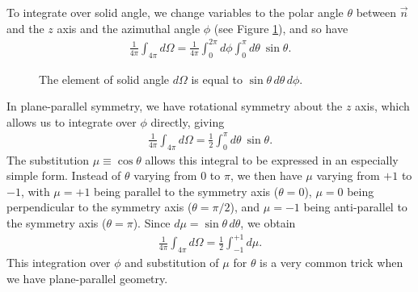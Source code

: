 \newslide

To integrate over solid angle, we change variables to the polar angle
$\theta$ between $\vec n$ and the $z$ axis and the azimuthal angle
$\phi$ (see Figure
\ref{fig-dOmega}), and so have
\begin{align}
\frac{1}{4\pi}
\int_{4\pi}\!\!\!d\Omega =
\frac{1}{4\pi}
\int_0^{2\pi}\!\!\!d\phi\int_0^\pi\!\!\!d\theta\:
\sin\theta.
\end{align}
\begin{figure}
\begin{center}
\end{center}
\caption{The element of solid angle $d\Omega$ is equal to $\sin\theta\,d\theta
\,d\phi$.}
\label{fig-dOmega}
\end{figure}

\newslide

In plane-parallel symmetry, we have rotational symmetry
about the $z$ axis, which allows us to integrate over $\phi$ directly,
giving
\begin{align}
\frac{1}{4\pi}
\int_{4\pi}\!\!\!d\Omega =
\frac{1}{2}\int_0^\pi\!\!\!d\theta\:
\sin\theta.
\end{align}
The substitution $\mu \equiv \cos\theta$ allows this integral to be
expressed in an especially simple form. Instead of $\theta$ varying from
0 to $\pi$, we then have $\mu$ varying from $+1$ to $-1$, with $\mu =
+1$ being parallel to the symmetry axis ($\theta = 0$), $\mu = 0$ being
perpendicular to the symmetry axis ($\theta =
\pi/2$), and $\mu = -1$ being anti-parallel to the symmetry axis ($\theta
= \pi$). Since $d\mu =
\sin\theta\,d\theta$, we obtain
\begin{align}
\frac{1}{4\pi}
\int_{4\pi}\!\!\!d\Omega =
\frac{1}{2} \int_{-1}^{+1} \!\!\!d\mu.
\end{align}
This integration over $\phi$ and substitution of $\mu$ for $\theta$ is a
very common trick when we have plane-parallel geometry. 

